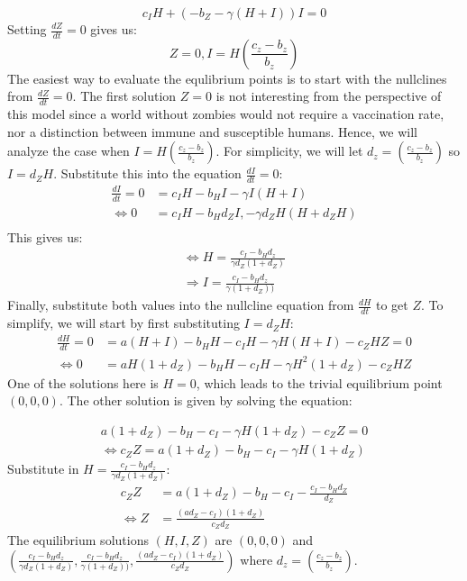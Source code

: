\documentclass[
	12pt
]{article}
\begin{document}
\begin{equation}
c_IH+(-b_Z-\gamma(H+I))I = 0
\end{equation}
Setting $\frac{dZ}{dt}=0$ gives us:
\begin{equation}
Z=0, I = H \left(\frac{c_z-b_z}{b_z}\right)
\end{equation}
The easiest way to evaluate the equlibrium points is to start with the nullclines from $\frac{dZ}{dt}=0$. The first solution $Z=0$ is not interesting from the perspective of this model since a world without zombies would not require a vaccination rate, nor a distinction between immune and susceptible humans. Hence, we will analyze  the case when $I = H \left(\frac{c_z-b_z}{b_z}\right)$. For simplicity, we will let $d_z = \left(\frac{c_z-b_z}{b_z}\right)$ so $I=d_ZH$. Substitute this into the equation $\frac{dI}{dt}=0$:
			\begin{align*}
				\frac{dI}{dt}= 0 &=  c_IH-b_HI-\gamma I(H+I) \\
				\Leftrightarrow 0&= c_IH-b_Hd_ZI,-\gamma d_ZH(H+d_ZH)\\
			\end{align*}
This gives us:
			\begin{align*}
				\Leftrightarrow H=\frac{c_I-b_Hd_z}{\gamma d_Z(1+d_Z)}\\
				\Rightarrow I =  \frac{c_I-b_Hd_z}{\gamma (1+d_Z))} 
			\end{align*}
Finally, substitute both values into the nullcline equation from $\frac{dH}{dt}$ to get $Z$. To simplify, we will start by first substituting $I=d_ZH$:
			\begin{align*}
				\frac{dH}{dt} = 0 &= a(H+I)-b_HH-c_IH-\gamma H(H+I)-c_ZHZ=0\\
				\Leftrightarrow 0&= aH(1+d_Z)-b_HH-c_IH-\gamma H^2(1+d_Z)-c_ZHZ
			\end{align*}
One of the solutions here is $H=0$, which leads to the trivial equilibrium point $(0,0,0)$. The other solution is given by solving the equation:

\begin{align*}
a(1+d_Z)-b_H-c_I-\gamma H(1+d_Z)-c_ZZ = 0\\
\Leftrightarrow c_ZZ = a(1+d_Z)-b_H-c_I-\gamma H(1+d_Z)
\end{align*}
Substitute in $H=\frac{c_I-b_Hd_z}{\gamma d_Z(1+d_Z)}$:
\begin{align*}
c_ZZ&=a(1+d_Z)-b_H-c_I-\frac{c_I-b_Hd_Z}{d_Z}\\
\Leftrightarrow Z&=\frac{(ad_Z-c_I)(1+d_Z)}{c_Zd_Z}
\end{align*}
The equilibrium solutions $(H,I,Z)$ are $(0,0,0)$ and $(\frac{c_I-b_Hd_z}{\gamma d_Z(1+d_Z)},  \frac{c_I-b_Hd_z}{\gamma (1+d_Z))} , \frac{(ad_Z-c_I)(1+d_Z)}{c_Zd_Z})$ where $d_z = \left(\frac{c_z-b_z}{b_z}\right)$.
\end{document}
